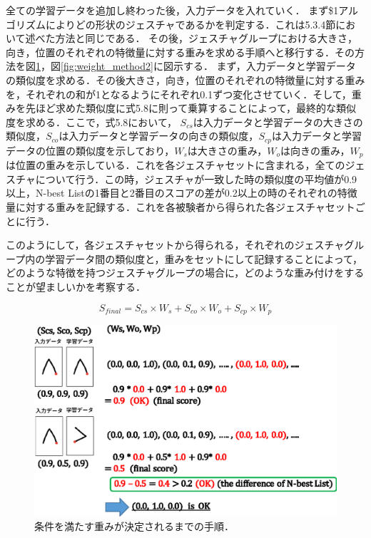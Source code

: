 全ての学習データを追加し終わった後，入力データを入れていく．
まず\$1アルゴリズムによりどの形状のジェスチャであるかを判定する．これは5.3.4節において述べた方法と同じである．
その後，ジェスチャグループにおける大きさ，向き，位置のそれぞれの特徴量に対する重みを求める手順へと移行する．その方法を図\ref{fig:weight_method1}，図\ref{fig:weight_method2}に図示する．
まず，入力データと学習データの類似度を求める．その後大きさ，向き，位置のそれぞれの特徴量に対する重みを，それぞれの和が1となるようにそれぞれ0.1ずつ変化させていく．そして，重みを先ほど求めた類似度に式5.8に則って乗算することによって，最終的な類似度を求める．ここで，式5.8において， $S_\textit{cs}$は入力データと学習データの大きさの類似度，$S_\textit{co}$は入力データと学習データの向きの類似度，$S_\textit{cp}$は入力データと学習データの位置の類似度を示しており，$W_\textit{s}$は大きさの重み，$W_\textit{o}$は向きの重み，$W_\textit{p}$は位置の重みを示している．これを各ジェスチャセットに含まれる，全てのジェスチャについて行う．この時，ジェスチャが一致した時の類似度の平均値が0.9以上，N-best Listの1番目と2番目のスコアの差が0.2以上の時のそれぞれの特徴量に対する重みを記録する．これを各被験者から得られた各ジェスチャセットごとに行う．

このようにして，各ジェスチャセットから得られる，それぞれのジェスチャグループ内の学習データ間の類似度と，重みをセットにして記録することによって，どのような特徴を持つジェスチャグループの場合に，どのような重み付けをすることが望ましいかを考察する．

\begin{equation}
S_\textit{final} = S_\textit{cs} \times W_\textit{s} + S_\textit{co} \times W_\textit{o} + S_\textit{cp} \times W_\textit{p}
\end{equation}

\begin{figure} [h!]
	\begin{center}
		\includegraphics [width=0.8\hsize ]{img/weight_method2.eps}
	\end{center}
	\caption{条件を満たす重みが決定されるまでの手順．}
	\label{fig:weight_method1}
\end{figure}


